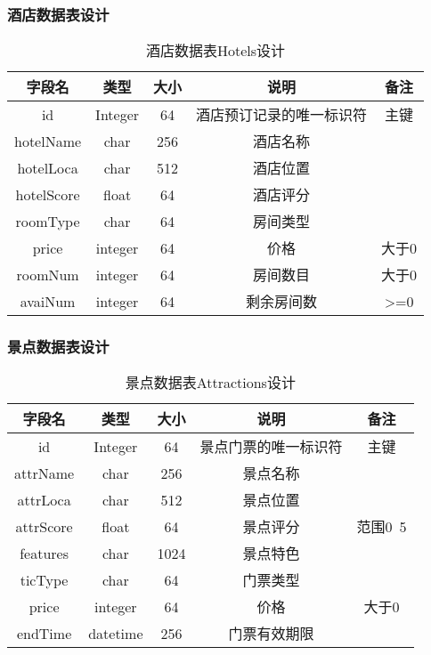 \subsubsection{酒店数据表设计}
\begin{table}[H]
\centering
\caption{酒店数据表Hotels设计} \label{tab:order-database}
\begin{tabular}{|c|c|c|c|c|}
    \hline
    字段名 & 类型 & 大小 & 说明 & 备注 \\
    \hline
    id & Integer & 64 & 酒店预订记录的唯一标识符 & 主键\\
    \hline
    hotelName & char & 256 & 酒店名称 &  \\
    \hline
    hotelLoca & char & 512 & 酒店位置 & \\
    \hline
    hotelScore & float & 64 & 酒店评分 & \\
    \hline
    roomType & char & 64 & 房间类型 & \\
    \hline
    price & integer & 64 & 价格 & 大于0 \\
    \hline
    roomNum & integer & 64 & 房间数目 & 大于0 \\
    \hline
    avaiNum & integer & 64 & 剩余房间数 & >=0 \\
    \hline
\end{tabular}
\end{table}

\subsubsection{景点数据表设计}
\begin{table}[H]
\centering
\caption{景点数据表Attractions设计} \label{tab:order-database}
\begin{tabular}{|c|c|c|c|c|}
    \hline
    字段名 & 类型 & 大小 & 说明 & 备注 \\
    \hline
    id & Integer & 64 & 景点门票的唯一标识符 & 主键\\
    \hline
    attrName & char & 256 & 景点名称 &  \\
    \hline
    attrLoca & char & 512 & 景点位置 & \\
    \hline
    attrScore & float & 64 & 景点评分 & 范围0~5\\
    \hline
    features & char & 1024 & 景点特色 & \\
    \hline
    ticType & char & 64 & 门票类型 & \\
    \hline
    price & integer & 64 & 价格 & 大于0 \\
    \hline
    endTime & datetime & 256 & 门票有效期限 & \\
    \hline
\end{tabular}
\end{table}


